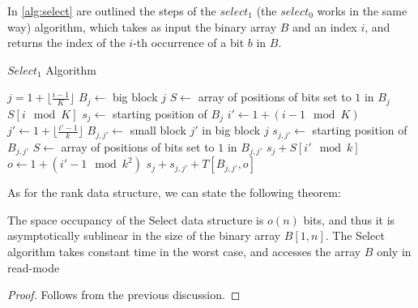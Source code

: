 \noindent In \ref{alg:select} are outlined the steps of the $select_1$ (the $select_0$ works in the same way) algorithm, which takes as input the binary array $B$ and an index $i$, and returns the index of the $i$-th occurrence of a bit $b$ in $B$.
\clearpage
\begin{algorithm}[ht!]
    \caption{$Select_1$ Algorithm} \label{alg:select}
    \begin{algorithmic}
        \State $ j = 1 + \lfloor \frac{i-1}{K} \rfloor$ 
        \State $B_{j} \gets$ big block $j$
        \State $S \gets$ array of positions of bits set to $1$ in $B_{j}$
        \State \Return $S[i \mod K]$
        \Else
        \State $s_j \gets$ starting position of $B_{j}$
        \State $i' \gets 1 + (i-1 \mod K)$ 
        \State $j' \gets 1 + \lfloor \frac{i'-1}{k} \rfloor$ 
        \State $B_{j,j'} \gets$ small block $j'$ in big block $j$
        \State $s_{j,j'} \gets$ starting position of $B_{j,j'}$
        \State $S \gets$ array of positions of bits set to $1$ in $B_{j,j'}$
        \State \Return $s_j + S[i' \mod k]$
        \Else
        \State $o \gets 1 + (i'-1 \mod k^2)$ 
        \State \Return $s_j + s_{j,j'} + T[B_{j,j'}, o]$
        \EndIf
        \EndIf
        \EndFunction
    \end{algorithmic}
\end{algorithm}

\noindent As for the rank data structure, we can state the following theorem:

\begin{theorem} \label{th:select}
    The space occupancy of the Select data structure is $o(n)$ bits, and thus it is asymptotically sublinear in the size of the binary array $B[1, n]$. The Select algorithm takes constant time in the worst case, and accesses the array $B$ only in read-mode
\end{theorem}
\begin{proof}
    Follows from the previous discussion.
\end{proof}

